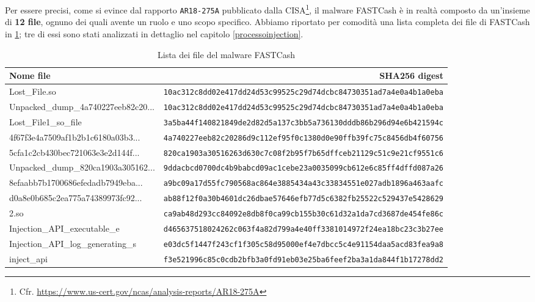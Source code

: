 \documentclass[10pt,a4paper, titlepage]{report}
\begin{document}
Per essere precisi, come si evince dal rapporto \texttt{AR18-275A} pubblicato dalla CISA\footnote{Cfr. \url{https://www.us-cert.gov/ncas/analysis-reports/AR18-275A}}, il malware FASTCash è in realtà composto da un'insieme di \textbf{12 file}, ognuno dei quali avente un ruolo e uno scopo specifico. Abbiamo riportato per comodità una lista completa dei file di FASTCash in \ref{tab:MalwareFileList}; tre di essi sono stati analizzati in dettaglio nel capitolo \ref{processoinjection}.

\begin{table}[h!]
 
    \caption{Lista dei file del malware FASTCash}
    \centering
    \small
    \label{tab:MalwareFileList}
    
    \begin{adjustbox}{center=\textwidth}
 
     \begin{tabular}{l|r}
      \toprule
      \textbf{Nome file} & \textbf{SHA256 digest} \\
      \midrule
      
      Lost\_File.so & \texttt{10ac312c8dd02e417dd24d53c99525c29d74dcbc84730351ad7a4e0a4b1a0eba} \\
      \hline
      Unpacked\_dump\_4a740227eeb82c20... & \texttt{10ac312c8dd02e417dd24d53c99525c29d74dcbc84730351ad7a4e0a4b1a0eba} \\
  \hline
  Lost\_File1\_so\_file & \texttt{3a5ba44f140821849de2d82d5a137c3bb5a736130dddb86b296d94e6b421594c} \\
    \hline
      4f67f3e4a7509af1b2b1c6180a03b3... & \texttt{4a740227eeb82c20286d9c112ef95f0c1380d0e90ffb39fc75c8456db4f60756} \\ 
      \hline
      5cfa1c2cb430bec721063e3e2d144f... & \texttt{820ca1903a30516263d630c7c08f2b95f7b65dffceb21129c51c9e21cf9551c6} \\
      \hline
      Unpacked\_dump\_820ca1903a305162... & \texttt{9ddacbcd0700dc4b9babcd09ac1cebe23a0035099cb612e6c85ff4dffd087a26} \\
      \hline
      8efaabb7b1700686efedadb7949eba... & \texttt{a9bc09a17d55fc790568ac864e3885434a43c33834551e027adb1896a463aafc} \\
      \hline
      d0a8e0b685c2ea775a74389973fc92... & \texttt{ab88f12f0a30b4601dc26dbae57646efb77d5c6382fb25522c529437e5428629} \\
      \hline
      2.so & \texttt{ca9ab48d293cc84092e8db8f0ca99cb155b30c61d32a1da7cd3687de454fe86c} \\
      \hline
      Injection\_API\_executable\_e & \texttt{d465637518024262c063f4a82d799a4e40ff3381014972f24ea18bc23c3b27ee}\\
      \hline
      Injection\_API\_log\_generating\_s & \texttt{e03dc5f1447f243cf1f305c58d95000ef4e7dbcc5c4e91154daa5acd83fea9a8}\\
      \hline
      inject\_api & \texttt{f3e521996c85c0cdb2bfb3a0fd91eb03e25ba6feef2ba3a1da844f1b17278dd2}\\
      

\end{tabular}
\end{adjustbox}
\end{table}
\end{document}
